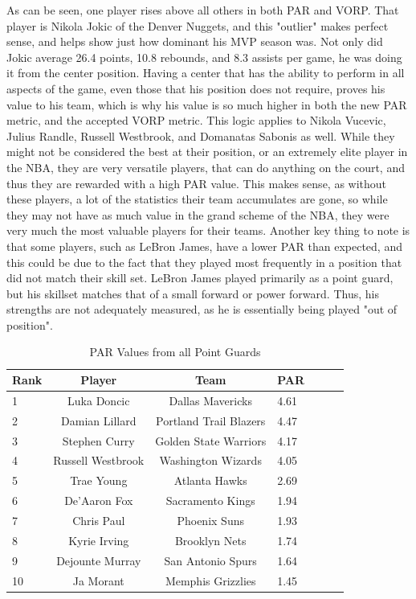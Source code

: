 \documentclass[12pt]{article}
\begin{document}
As can be seen, one player rises above all others in both PAR and VORP. That player is Nikola Jokic of the 
Denver Nuggets, and this "outlier" makes perfect sense, and helps show just how dominant his MVP 
season was. Not only did Jokic average 26.4 points, 10.8 rebounds, and 8.3 assists per game, he was 
doing it from the center position. Having a center that has the ability to perform in all aspects of the game, 
even those that his position does not require, proves his value to his team, which is why his value is so 
much higher in both the new PAR metric, and the accepted VORP metric. This logic applies to Nikola 
Vucevic, Julius Randle, Russell Westbrook, and Domanatas Sabonis as well. While they might not be 
considered the best at their position, or an extremely elite player in the NBA, they are very versatile players, 
that can do anything on the court, and thus they are rewarded with a high PAR value. This makes sense, as 
without these players, a lot of the statistics their team accumulates are gone, so while they may not have as 
much value in the grand scheme of the NBA, they were very much the most valuable players for their 
teams. Another key thing to note is that some players, such as LeBron James, have a lower PAR than 
expected, and this could be due to the fact that they played most frequently in a position that did not match 
their skill set. LeBron James played primarily as a point guard, but his skillset matches that of a small 
forward or power forward. Thus, his strengths are not adequately measured, as he is essentially being 
played "out of position".

\begin{table}[H]
  \caption{PAR Values from all Point Guards}
  \label{tab:PGtable}
\centering
\begin{tabular}[t]{lccllll}
  \toprule
  Rank & Player & Team & PAR\\
  \midrule
 1 & Luka Doncic & Dallas Mavericks & 4.61\\
  \midrule
 2 & Damian Lillard & Portland Trail Blazers & 4.47\\
  \midrule
 3 & Stephen Curry & Golden State Warriors & 4.17\\
  \midrule
 4 & Russell Westbrook & Washington Wizards & 4.05\\
  \midrule
 5 & Trae Young & Atlanta Hawks & 2.69\\
  \midrule
 6 & De'Aaron Fox & Sacramento Kings & 1.94\\
  \midrule
 7 & Chris Paul & Phoenix Suns & 1.93\\
  \midrule
 8 & Kyrie Irving & Brooklyn Nets & 1.74\\
  \midrule
 9 & Dejounte Murray & San Antonio Spurs & 1.64\\
  \midrule
 10 & Ja Morant & Memphis Grizzlies & 1.45\\
  \bottomrule
\end{tabular}
\end{table}
\end{document}
